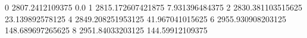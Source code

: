 0 2807.2412109375 0.0
1 2815.172607421875 7.931396484375
2 2830.381103515625 23.139892578125
4 2849.208251953125 41.967041015625
6 2955.930908203125 148.689697265625
8 2951.84033203125 144.59912109375
